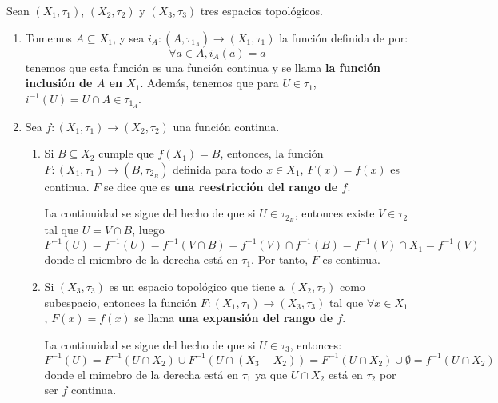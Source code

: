 \documentclass[12pt]{report}
\theoremstyle{largebreak}
\newcommand\cf[3]{\ensuremath{#1:#2\rightarrow#3}}
\begin{document}
    \begin{exa}
        Sean $(X_1,\tau_1)$, $(X_2,\tau_2)$ y $(X_3,\tau_3)$ tres espacios topológicos.
        \begin{enumerate}
            \item Tomemos $A\subseteq X_1$, y sea $\cf{i_A}{(A,\tau_{1_A})}{(X_1,\tau_1)}$ la función definida de por:
            \begin{equation*}
                \forall a\in A, i_A(a)=a
            \end{equation*}
            tenemos que esta función es una función continua y se llama \textbf{la función inclusión de $A$ en $X_1$}. Además, tenemos que para $U\in \tau_1$, $i^{-1}(U)=U\cap A\in\tau_{1_A}$.
            \item Sea $\cf{f}{(X_1,\tau_1)}{(X_2,\tau_2)}$ una función continua.
            \begin{enumerate}
                \item Si $B\subseteq X_2$ cumple que $f(X_1)=B$, entonces, la función $\cf{F}{(X_1,\tau_1)}{(B,\tau_{2_B})}$ definida para todo $x\in X_1$, $F(x)=f(x)$ es continua. $F$ se dice que es \textbf{una reestricción del rango de $f$}.
                
                La continuidad se sigue del hecho de que si $U\in\tau_{2_B}$, entonces existe $V\in\tau_2$ tal que $U=V\cap B$, luego
                \begin{equation*}
                    F^{-1}(U)=f^{-1}(U)=f^{-1}(V\cap B)=f^{-1}(V)\cap f^{-1}(B)=f^{-1}(V)\cap X_1=f^{-1}(V)
                \end{equation*}
                donde el miembro de la derecha está en $\tau_1$. Por tanto, $F$ es continua.
                \item Si $(X_3,\tau_3)$ es un espacio topológico que tiene a $(X_2,\tau_2)$ como subespacio, entonces la función $\cf{F}{(X_1,\tau_1)}{(X_3,\tau_3)}$ tal que $\forall x\in X_1$, $F(x)=f(x)$ se llama \textbf{una expansión del rango de $f$}.
                
                La continuidad se sigue del hecho de que si $U\in\tau_3$, entonces:
                \begin{equation*}
                    F^{-1}(U)=F^{-1}(U\cap X_2)\cup F^{-1}(U\cap (X_3-X_2))=F^{-1}(U\cap X_2)\cup\emptyset=f^{-1}(U\cap X_2)
                \end{equation*}
                donde el mimebro de la derecha está en $\tau_1$ ya que $U\cap X_2$ está en $\tau_2$ por ser $f$ continua.


\end{enumerate}
\end{enumerate}
\end{exa}
\end{document}
